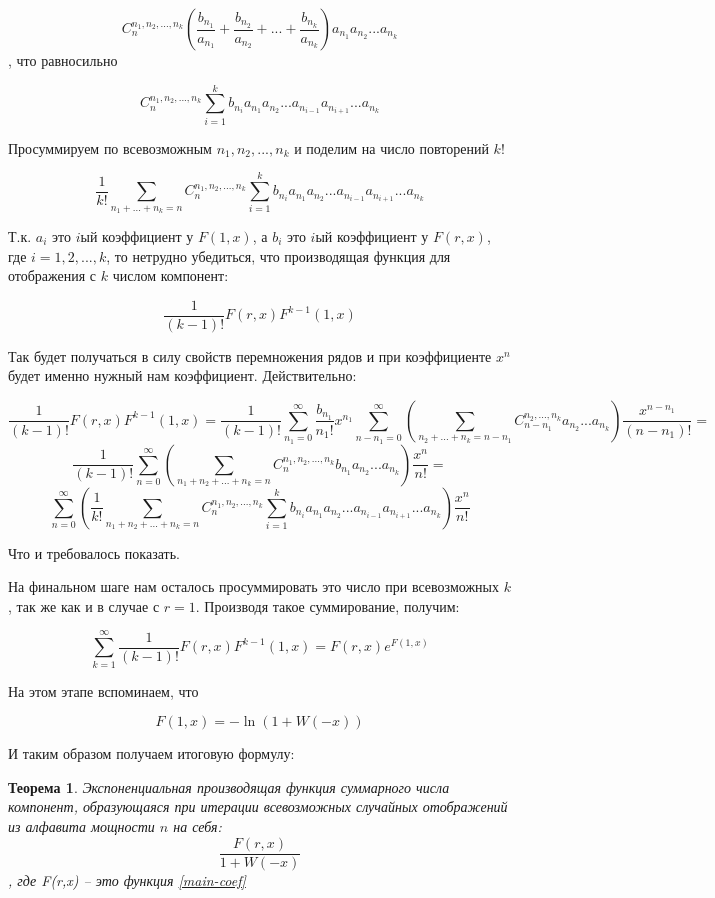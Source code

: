 \documentclass[10pt, a4paper]{report}
\newtheorem{theorem}{Теорема}[chapter]
\theoremstyle{definition}
\renewcommand{\log}{\ln}
\begin{document}
$$
C_n^{n_1,n_2,...,n_k}(\frac {b_{n_1}} {a_{n_1}}+ \frac {b_{n_2}} {a_{n_2}} + ... + \frac {b_{n_k}} {a_{n_k}})a_{n_1}a_{n_2}...a_{n_k}
$$, что равносильно 

$$
C_n^{n_1,n_2,...,n_k}\sum_{i=1}^{k} b_{n_i} a_{n_1} a_{n_2}...a_{n_{i-1}}a_{n_{i+1}}...a_{n_k}
$$

Просуммируем по всевозможным $n_1, n_2, ..., n_k$ и поделим на число повторений $k!$

$$
\frac 1 {k!}\sum_{n_1+...+n_k=n}C_n^{n_1,n_2,...,n_k}\sum_{i=1}^{k} b_{n_i} a_{n_1} a_{n_2}...a_{n_{i-1}}a_{n_{i+1}}...a_{n_k}
$$

Т.к. $a_i$ это $i$ый коэффициент у $F(1,x)$, а $b_i$ это $iый$ коэффициент у $F(r,x)$, где $i=1,2,...,k$, то нетрудно убедиться, что производящая функция для отображения с $k$ числом компонент: 

$$\frac 1 {(k-1)!} F(r,x)F^{k-1}(1,x)$$

Так будет получаться в силу свойств перемножения рядов и при коэффициенте $x^n$ будет именно нужный нам коэффициент. Действительно:

$$
\frac 1 {(k-1)!} F(r,x)F^{k-1}(1,x) = \frac 1 {(k-1)!}  \sum_{n_1=0}^{\infty} \frac{b_{n_1}}{n_1!} x^{n_1}\sum_{n-n_1=0}^\infty\left(\sum_{n_2+...+n_k=n-n_1} C_{n-n_1}^{n_2,...,n_k} a_{n_2}...a_{n_k}\right)\frac {x^{n-n_1}}{(n-n_1)!}=
$$
$$
\frac 1 {(k-1)!}  \sum_{n=0}^\infty\left(\sum_{n_1+n_2+...+n_k=n} C_{n}^{n_1, n_2,...,n_k} b_{n_1}a_{n_2}...a_{n_k}\right)\frac {x^n}{n!}=
$$
$$
 \sum_{n=0}^\infty \left( \frac 1 {k!} \sum_{n_1+n_2+...+n_k=n} C_{n}^{n_1, n_2,...,n_k} \sum_{i=1}^{k}b_{n_i} a_{n_1} a_{n_2}...a_{n_{i-1}}a_{n_{i+1}}...a_{n_k}\right)\frac {x^n}{n!}
$$

Что и требовалось показать.

На финальном шаге нам осталось просуммировать это число при всевозможных $k$, так же как и в случае с $r=1$. Производя такое суммирование, получим:

$$\sum_{k=1}^{\infty}\frac 1 {(k-1)!} F(r,x)F^{k-1}(1,x) = F(r,x)e^{F(1,x)}$$

На этом этапе вспоминаем, что 

$$
F(1,x) = -\log(1+W(-x))
$$

И таким образом получаем итоговую формулу:

\begin{theorem}
	Экспоненциальная производящая функция суммарного числа компонент, образующаяся при итерации всевозможных случайных отображений из алфавита мощности $n$ на себя:
$$
\frac{F(r,x)}{1+W(-x)}
$$, где F(r,x) -- это функция \eqref{main-coef}
\end{theorem}
\end{document}

